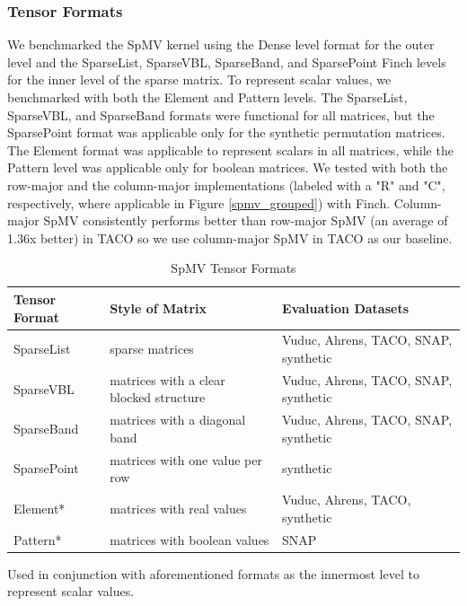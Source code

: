 \subsubsection{Tensor Formats}
 We benchmarked the SpMV kernel using the Dense level format for the outer level and the SparseList, SparseVBL, SparseBand, and SparsePoint Finch levels for the inner level of the sparse matrix. To represent scalar values, we benchmarked with both the Element and Pattern levels. The SparseList, SparseVBL, and SparseBand formats were functional for all matrices, but the SparsePoint format was applicable only for the synthetic permutation matrices. The Element format was applicable to represent scalars in all matrices, while the Pattern level was applicable only for boolean matrices. We tested with both the row-major and the column-major implementations (labeled with a "R" and "C", respectively, where applicable in Figure \ref{spmv_grouped}) with Finch. Column-major SpMV consistently performs better than row-major SpMV (an average of 1.36x better) in TACO so we use column-major SpMV in TACO as our baseline.

\begin{table}[htbp]
    \centering
    \caption{SpMV Tensor Formats}
    \begin{tabular}{|l|l|l|}
        \hline
        \textbf{Tensor Format} & \textbf{Style of Matrix} & \textbf{Evaluation Datasets} \\
        \hline
        SparseList & sparse matrices & Vuduc, Ahrens, TACO, SNAP, synthetic \\
        \hline
        SparseVBL & matrices with a clear blocked structure & Vuduc, Ahrens, TACO, SNAP, synthetic  \\
        \hline 
        SparseBand & matrices with a diagonal band & Vuduc, Ahrens, TACO, SNAP, synthetic \\ 
        \hline 
        SparsePoint & matrices with one value per row & synthetic \\
        \hline
        Element* & matrices with real values & Vuduc, Ahrens, TACO, synthetic \\
        \hline
        Pattern* & matrices with boolean values & SNAP  \\
        \hline 
    \end{tabular}
    \footnotesize *Used in conjunction with aforementioned formats as the innermost level to represent scalar values.
\end{table}

